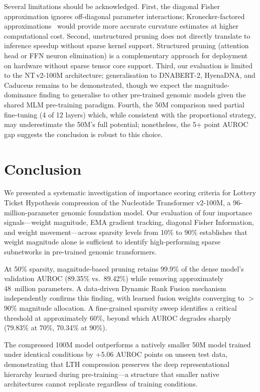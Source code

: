\documentclass[journal]{IEEEtran}
\newcommand{\ntv}{NT\,v2-100M}
\begin{document}
Several limitations should be acknowledged.
First, the diagonal Fisher approximation ignores off-diagonal
parameter interactions; Kronecker-factored
approximations~\cite{Martens2015} would provide more accurate
curvature estimates at higher computational cost.
Second, unstructured pruning does not directly translate to
inference speedup without sparse kernel support.
Structured pruning (attention head or FFN neuron elimination)
is a complementary approach for deployment on hardware without
sparse tensor core support.
Third, our evaluation is limited to the \ntv{} architecture;
generalisation to DNABERT-2, HyenaDNA, and Caduceus remains
to be demonstrated, though we expect the magnitude-dominance
finding to generalise to other pre-trained genomic models
given the shared MLM pre-training paradigm.
Fourth, the 50M comparison used partial fine-tuning (4 of
12 layers) which, while consistent with the proportional
strategy, may underestimate the 50M's full potential;
nonetheless, the 5+ point AUROC gap suggests the conclusion
is robust to this choice.


\section{Conclusion}
\label{sec:conclusion}

We presented a systematic investigation of importance scoring
criteria for Lottery Ticket Hypothesis compression of the
Nucleotide Transformer v2-100M, a 96-million-parameter
genomic foundation model.
Our evaluation of four importance signals---weight magnitude,
EMA gradient tracking, diagonal Fisher Information, and weight
movement---across sparsity levels from 10\% to 90\%
establishes that weight magnitude alone is sufficient to
identify high-performing sparse subnetworks in pre-trained
genomic transformers.

At 50\% sparsity, magnitude-based pruning retains 99.9\% of
the dense model's validation AUROC (89.35\% vs.\ 89.42\%)
while removing approximately 48~million parameters.
A data-driven Dynamic Rank Fusion mechanism independently
confirms this finding, with learned fusion weights converging
to $>$90\% magnitude allocation.
A fine-grained sparsity sweep identifies a critical threshold
at approximately 60\%, beyond which AUROC degrades sharply
(79.83\% at 70\%, 70.34\% at 90\%).

The compressed 100M model outperforms a natively smaller 50M
model trained under identical conditions by +5.06 AUROC points
on unseen test data, demonstrating that LTH compression
preserves the deep representational hierarchy learned during
pre-training---a structure that smaller native architectures
cannot replicate regardless of training conditions.
\end{document}
